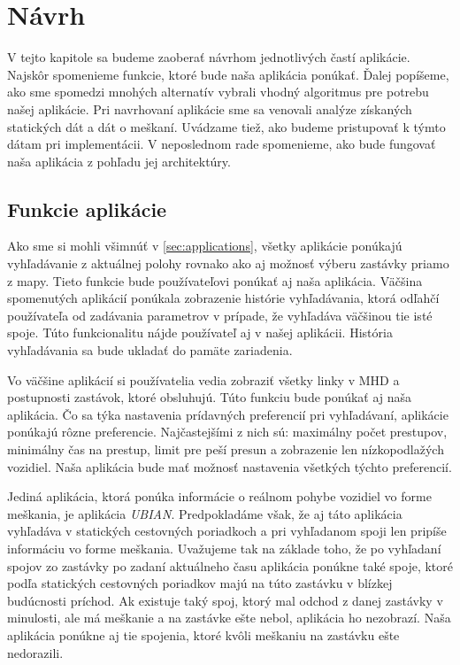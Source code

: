 \chapter{Návrh}
\label{kap:nav}
V tejto kapitole sa budeme zaoberať návrhom jednotlivých častí aplikácie. Najskôr spomenieme funkcie, ktoré bude naša aplikácia ponúkať. Ďalej popíšeme, ako sme spomedzi mnohých alternatív vybrali vhodný algoritmus pre potrebu našej aplikácie. Pri navrhovaní aplikácie sme sa venovali analýze získaných statických dát a dát o meškaní. Uvádzame tiež, ako budeme pristupovať k týmto dátam pri implementácii. V neposlednom rade spomenieme, ako bude fungovať naša aplikácia z pohľadu jej architektúry.

\section{Funkcie aplikácie}
Ako sme si mohli všimnúť v \ref{sec:applications}, všetky aplikácie ponúkajú vyhľadávanie z aktuálnej polohy rovnako ako aj možnosť výberu zastávky priamo z mapy. Tieto funkcie bude používateľovi ponúkať aj naša aplikácia. Väčšina spomenutých aplikácií ponúkala zobrazenie histórie vyhľadávania, ktorá odľahčí používateľa od zadávania parametrov v prípade, že vyhľadáva väčšinou tie isté spoje. Túto funkcionalitu nájde používateľ aj v našej aplikácii. História vyhľadávania sa bude ukladať do pamäte zariadenia. 

Vo väčšine aplikácií si používatelia vedia zobraziť všetky linky v MHD a postupnosti zastávok, ktoré obsluhujú. Túto funkciu bude ponúkať aj naša aplikácia. Čo sa týka nastavenia prídavných preferencií pri vyhľadávaní, aplikácie ponúkajú rôzne preferencie. Najčastejšími z nich sú: maximálny počet prestupov, minimálny čas na prestup, limit pre peší presun a zobrazenie len nízkopodlažých vozidiel. Naša aplikácia bude mať možnosť nastavenia všetkých týchto preferencií.

Jediná aplikácia, ktorá ponúka informácie o reálnom pohybe vozidiel vo forme meškania, je aplikácia \textit{UBIAN}. Predpokladáme však, že aj táto aplikácia vyhľadáva v statických cestovných poriadkoch a pri vyhľadanom spoji len pripíše informáciu vo forme meškania. Uvažujeme tak na základe toho, že po vyhľadaní spojov zo zastávky po zadaní aktuálneho času aplikácia ponúkne také spoje, ktoré podľa statických cestovných poriadkov majú na túto zastávku v blízkej budúcnosti príchod. Ak existuje taký spoj, ktorý mal odchod z danej zastávky v minulosti, ale má meškanie a na zastávke ešte nebol, aplikácia ho nezobrazí. Naša aplikácia ponúkne aj tie spojenia, ktoré kvôli meškaniu na zastávku ešte nedorazili.

